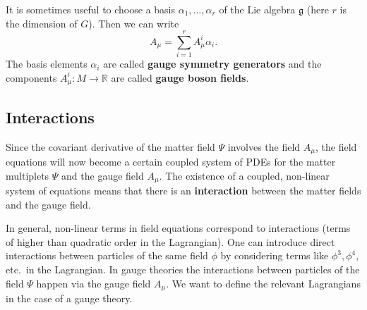 \documentclass[11pt]{amsart}
\theoremstyle{definition}
\theoremstyle{remark}
\numberwithin{equation}{section}
\begin{document}
It is sometimes useful to choose a basis $\alpha_1,\ldots,\alpha_r$ of the Lie algebra $\mathfrak{g}$ (here $r$ is the dimension of $G$). Then we can write
\begin{equation*}
A_\mu=\sum_{i=1}^rA_\mu^i\alpha_i.
\end{equation*} 
The basis elements $\alpha_i$ are called {\bf gauge symmetry generators} and the components $A_\mu^i\colon M\rightarrow\mathbb{R}$ are called {\bf gauge boson fields}.

\subsection{Interactions}
Since the covariant derivative of the matter field $\Psi$ involves the field $A_\mu$, the field equations will now become a certain coupled system of PDEs for the matter multiplets $\Psi$ and the gauge field $A_\mu$. The existence of a coupled, non-linear system of equations means that there is an {\bf interaction} between the matter fields and the gauge field. 

In general, non-linear terms in field equations correspond to interactions (terms of higher than quadratic order in the Lagrangian). One can introduce direct interactions between particles of the same field $\phi$ by considering terms like $\phi^3, \phi^4$, etc.~in the Lagrangian. In gauge theories the interactions between particles of the field $\Psi$ happen via the gauge field $A_\mu$. We want to define the relevant Lagrangians in the case of a gauge theory. 
\end{document}
